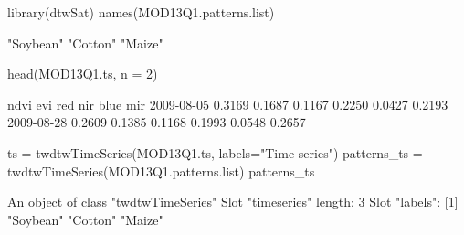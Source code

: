 \documentclass[article,shortnames]{jss}
\begin{document}
\begin{CodeChunk}
\begin{CodeInput}
library(dtwSat)
names(MOD13Q1.patterns.list)
\end{CodeInput}
\begin{CodeOutput}
[1] "Soybean" "Cotton"  "Maize"  
\end{CodeOutput}
\begin{CodeInput}
head(MOD13Q1.ts, n = 2)
\end{CodeInput}
\begin{CodeOutput}
             ndvi    evi    red    nir   blue    mir
2009-08-05 0.3169 0.1687 0.1167 0.2250 0.0427 0.2193
2009-08-28 0.2609 0.1385 0.1168 0.1993 0.0548 0.2657
\end{CodeOutput}
\end{CodeChunk}\begin{CodeChunk}
\begin{CodeInput}
ts = twdtwTimeSeries(MOD13Q1.ts, labels="Time series")
patterns_ts = twdtwTimeSeries(MOD13Q1.patterns.list)
patterns_ts
\end{CodeInput}
\begin{CodeOutput}
An object of class "twdtwTimeSeries"
Slot "timeseries" length: 3 
Slot "labels": [1] "Soybean" "Cotton"  "Maize"  
\end{CodeOutput}
\end{CodeChunk}
\end{document}
